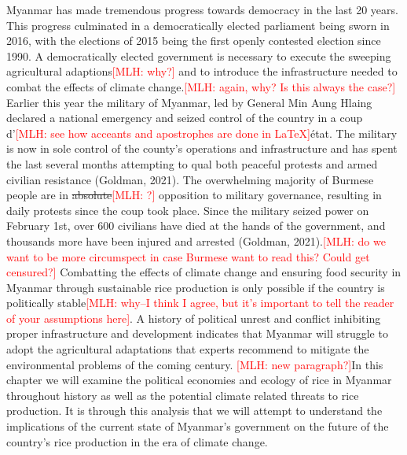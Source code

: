\documentclass{book}\usepackage{knitr}
\newcommand{\red}[1]{\textcolor{red}{[MLH: #1]}}
\begin{document}
{Myanmar has made tremendous progress towards democracy in the last 20 years. This progress culminated in a democratically elected parliament being sworn in 2016, with the elections of 2015 being the first openly contested election since 1990. A democratically elected government is necessary to execute the sweeping agricultural adaptions\red{why?} and to introduce the infrastructure needed to combat the effects of climate change.\red{again, why? Is this always the case?} Earlier this year the military of Myanmar, led by General Min Aung Hlaing declared a national emergency and seized control of the country in a coup d’\red{see how acceants and apostrophes are done in \LaTeX}état. The military is now in sole control of the county’s operations and infrastructure and has spent the last several months attempting to qual both peaceful protests and armed civilian resistance (Goldman, 2021). The overwhelming majority of Burmese people are in \st{absolute}\red{?} opposition to military governance, resulting in daily protests since the coup took place. Since the military seized power on February 1st, over 600 civilians have died at the hands of the government, and thousands more have been injured and arrested (Goldman, 2021).\red{do we want to be more circumspect in case Burmese want to read this?  Could get censured?} 
Combatting the effects of climate change and ensuring food security in Myanmar through sustainable rice production is only possible if the country is politically stable\red{why--I think I agree, but it's important to tell the reader of your assumptions here}. A history of political unrest and conflict inhibiting proper infrastructure and development indicates that Myanmar will struggle to adopt the agricultural adaptations that experts recommend to mitigate the environmental problems of the coming century. \red{new paragraph?}In this chapter we will examine the political economies and ecology of rice in Myanmar throughout history as well as the potential climate related threats to rice production. It is through this analysis that we will attempt to understand the implications of the current state of Myanmar’s government on the future of the country’s rice production in the era of climate change. 

}
\end{document}
